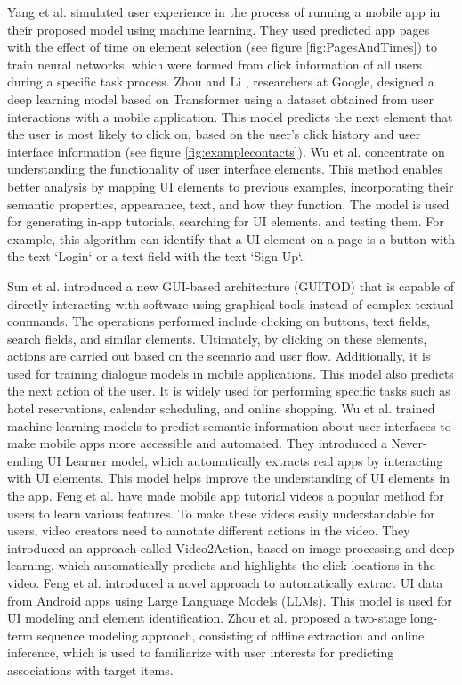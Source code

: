 \documentclass[sn-mathphys-num, Numbered]{sn-jnl}%
\theoremstyle{thmstyleone}%
\theoremstyle{thmstyletwo}%
\theoremstyle{thmstylethree}%
\begin{document}
Yang et al. \cite{yang2020measuring} simulated user experience in the process of running a mobile app in their proposed model using machine learning. They used predicted app pages with the effect of time on element selection (see figure \ref{fig:PagesAndTimes}) to train neural networks, which were formed from click information of all users during a specific task process. Zhou and Li \cite{zhou2021large}, researchers at Google, designed a deep learning model based on Transformer using a dataset obtained from user interactions with a mobile application. This model predicts the next element that the user is most likely to click on, based on the user's click history and user interface information (see figure \ref{fig:examplecontacts}).
Wu et al. \cite{wu2023screen} concentrate on understanding the functionality of user interface elements. This method enables better analysis by mapping UI elements to previous examples, incorporating their semantic properties, appearance, text, and how they function. The model is used for generating in-app tutorials, searching for UI elements, and testing them. For example, this algorithm can identify that a UI element on a page is a button with the text `Login` or a text field with the text `Sign Up`.

Sun et al. \cite{sun2022meta} introduced a new GUI-based architecture (GUITOD) that is capable of directly interacting with software using graphical tools instead of complex textual commands. The operations performed include clicking on buttons, text fields, search fields, and similar elements. Ultimately, by clicking on these elements, actions are carried out based on the scenario and user flow. Additionally, it is used for training dialogue models in mobile applications. This model also predicts the next action of the user. It is widely used for performing specific tasks such as hotel reservations, calendar scheduling, and online shopping. Wu et al.\cite{wu2023never} trained machine learning models to predict semantic information about user interfaces to make mobile apps more accessible and automated. They introduced a Never-ending UI Learner model, which automatically extracts real apps by interacting with UI elements. This model helps improve the understanding of UI elements in the app. Feng et al.\cite{feng2023video2action} have made mobile app tutorial videos a popular method for users to learn various features. To make these videos easily understandable for users, video creators need to annotate different actions in the video. They introduced an approach called Video2Action, based on image processing and deep learning, which automatically predicts and highlights the click locations in the video. Feng et al.\cite{feng2024mud} introduced a novel approach to automatically extract UI data from Android apps using Large Language Models (LLMs). This model is used for UI modeling and element identification. Zhou et al.\cite{zhou2024encode} proposed a two-stage long-term sequence modeling approach, consisting of offline extraction and online inference, which is used to familiarize with user interests for predicting associations with target items.
\end{document}
